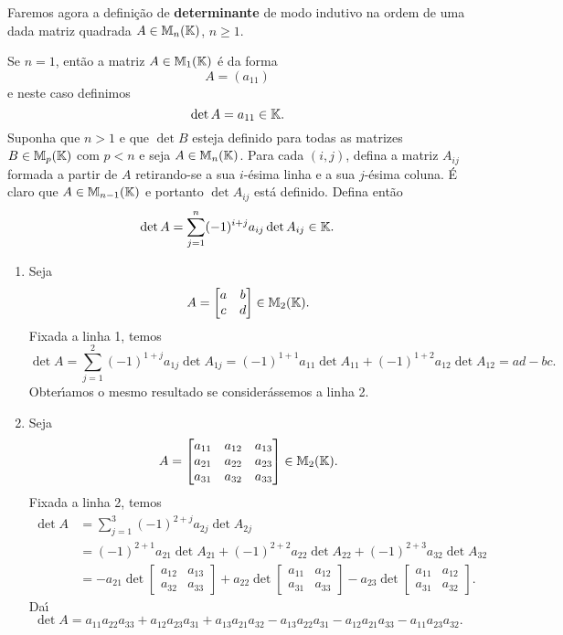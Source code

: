 Faremos agora a defini\c{c}\~ao de \textbf{determinante} de modo indutivo na ordem de uma dada matriz quadrada $A \in \mathbb{M}_n(\mathbb{K})$, $n \ge 1$.

Se $n = 1$, ent\~ao a matriz $A \in \mathbb{M}_1(\mathbb{K})$ \'e da forma
\[
A = (a_{11})
\]
e neste caso definimos
\[
\det A = a_{11} \in \mathbb{K}.
\]
Suponha que $n > 1$ e que $\det B$ esteja definido para todas as matrizes  $B \in \mathbb{M}_p(\mathbb{K})$ com $p < n$ e seja 
$A \in \mathbb{M}_n(\mathbb{K})$. Para cada $(i,j)$, defina a matriz $A_{ij}$ formada a partir de $A$ retirando-se a sua $i$-\'esima linha e a sua $j$-\'esima coluna. \'E claro que $A \in \mathbb{M}_{n - 1}(\mathbb{K})$ e portanto $\det A_{ij}$ est\'a definido. Defina ent\~ao
\[
\det A = \sum_{j = 1}^n(-1)^{i + j}a_{ij}\det A_{ij} \in \mathbb{K}.
\]

\begin{exemplo}
\begin{enumerate}
	\item Seja
	\[
	A = \begin{bmatrix}
	a & b\\
	c & d
	\end{bmatrix} \in \mathbb{M}_2(\mathbb{K}).
	\]
	Fixada a linha 1, temos
	\[
	\det A = \sum_{j = 1}^2(-1)^{1 + j}a_{1j}\det A_{1j} = (-1)^{1 + 1}a_{11}\det A_{11} + (-1)^{1 + 2}a_{12}\det A_{12} = ad - bc.
	\]
	Obter{\'\i}amos o mesmo resultado se consider\'assemos a linha 2.

	\item Seja
	\[
	A = \begin{bmatrix}
	a_{11} & a_{12} & a_{13}\\
	a_{21} & a_{22} & a_{23}\\
	a_{31} & a_{32} & a_{33}
	\end{bmatrix} \in \mathbb{M}_2(\mathbb{K}).
	\]
	Fixada a linha 2, temos
	\begin{align*}
	\det A &= \sum_{j = 1}^3(-1)^{2 + j}a_{2j}\det A_{2j} \\ &= (-1)^{2 + 1}a_{21}\det A_{21} + (-1)^{2 + 2}a_{22}\det A_{22} + (-1)^{2 + 3}a_{32}\det A_{32}\\ &= -a_{21}\det\begin{bmatrix}a_{12} & a_{13}\\a_{32} & a_{33}\end{bmatrix} + a_{22}\det\begin{bmatrix}a_{11} & a_{12}\\a_{31} & a_{33}\end{bmatrix} - a_{23}\det\begin{bmatrix}a_{11} & a_{12}\\a_{31} & a_{32}\end{bmatrix}.
	\end{align*}
	Da{\'\i}
	\[
	\det A = a_{11}a_{22}a_{33} + a_{12}a_{23}a_{31} + a_{13}a_{21}a_{32} - a_{13}a_{22}a_{31} - a_{12}a_{21}a_{33} - 
	a_{11}a_{23}a_{32}.
	\]
\end{enumerate}
\end{exemplo}

